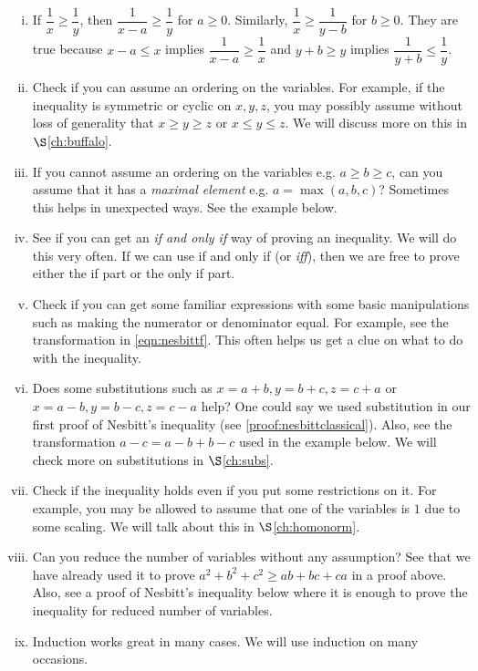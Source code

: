 \documentclass{subfile}
\begin{document}
		\begin{enumerate}[(i)]
			\item If $\dfrac{1}{x}\geq\dfrac{1}{y}$, then $\dfrac{1}{x-a}\geq\dfrac{1}{y}$ for $a\geq0$. Similarly, $\dfrac{1}{x}\geq\dfrac{1}{y-b}$ for $b\geq0$. They are true because $x-a\leq x$ implies $\dfrac{1}{x-a}\geq\dfrac{1}{x}$ and $y+b\geq y$ implies $\dfrac{1}{y+b}\leq\dfrac{1}{y}$.
			\item Check if you can assume an ordering on the variables. For example, if the inequality is symmetric or cyclic on $x,y,z$, you may possibly assume without loss of generality that $x\geq y\geq z$ or $x\leq y\leq z$. We will discuss more on this in \hyperref[ch:buffalo]{$\S$\ref{ch:buffalo}}.
			\item If you cannot assume an ordering on the variables e.g. $a\geq b\geq c$, can you assume that it has a \emph{maximal element} e.g. $a=\max(a,b,c)$? Sometimes this helps in unexpected ways. See the example below.
			\item See if you can get an \emph{if and only if} way of proving an inequality. We will do this very often. If we can use if and only if (or \emph{iff}), then we are free to prove either the if part or the only if part.
			\item Check if you can get some familiar expressions with some basic manipulations such as making the numerator or denominator equal. For example, see the transformation in \hyperref[eqn:nesbittf]{\ref{eqn:nesbittf}}. This often helps us get a clue on what to do with the inequality.
			\item Does some substitutions such as $x=a+b,y=b+c,z=c+a$ or $x=a-b,y=b-c,z=c-a$ help? One could say we used substitution in our first proof of Nesbitt's inequality (see \autoref{proof:nesbittclassical}). Also, see the transformation $a-c=a-b+b-c$ used in the example below. We will check more on substitutions in \hyperref[ch:subs]{$\S$\ref{ch:subs}}.
			\item Check if the inequality holds even if you put some restrictions on it. For example, you may be allowed to assume that one of the variables is $1$ due to some scaling. We will talk about this in \hyperref[ch:homonorm]{$\S$\ref{ch:homonorm}}.
			\item Can you reduce the number of variables without any assumption? See that we have already used it to prove $a^2+b^2+c^2\geq ab+bc+ca$ in a proof above. Also, see a proof of Nesbitt's inequality below where it is enough to prove the inequality for reduced number of variables.
			\item Induction works great in many cases. We will use induction on many occasions.
		\end{enumerate}
\end{document}

